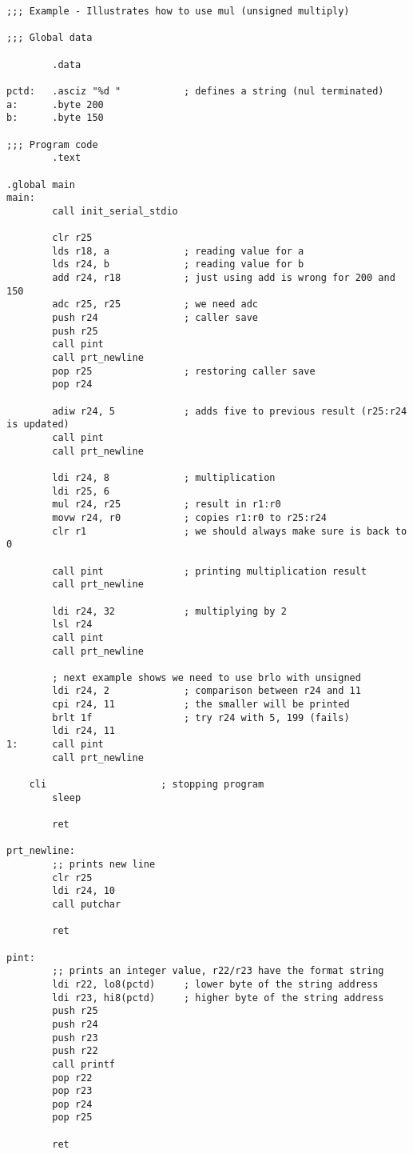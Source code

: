 \lstset{
caption=Unsigned Multiplication
}
\begin{lstlisting}
;;; Example - Illustrates how to use mul (unsigned multiply)
 
;;; Global data

        .data                 

pctd:   .asciz "%d "           ; defines a string (nul terminated)
a:      .byte 200
b:      .byte 150

;;; Program code
        .text                 

.global main                  
main:                          
        call init_serial_stdio

        clr r25
        lds r18, a             ; reading value for a
        lds r24, b             ; reading value for b
        add r24, r18           ; just using add is wrong for 200 and 150
        adc r25, r25           ; we need adc
        push r24               ; caller save
        push r25
        call pint
        call prt_newline
        pop r25                ; restoring caller save
        pop r24 

        adiw r24, 5            ; adds five to previous result (r25:r24 is updated) 
        call pint
        call prt_newline
         
        ldi r24, 8             ; multiplication
        ldi r25, 6 
        mul r24, r25           ; result in r1:r0
        movw r24, r0           ; copies r1:r0 to r25:r24
        clr r1                 ; we should always make sure is back to 0 

        call pint              ; printing multiplication result
        call prt_newline

        ldi r24, 32            ; multiplying by 2
        lsl r24 
        call pint
        call prt_newline

        ; next example shows we need to use brlo with unsigned
        ldi r24, 2             ; comparison between r24 and 11
        cpi r24, 11            ; the smaller will be printed
        brlt 1f                ; try r24 with 5, 199 (fails)
        ldi r24, 11            
1:      call pint
        call prt_newline

    cli                    ; stopping program
        sleep                          

        ret                    

prt_newline:                   
        ;; prints new line
        clr r25
        ldi r24, 10
        call putchar

        ret

pint:
        ;; prints an integer value, r22/r23 have the format string
        ldi r22, lo8(pctd)     ; lower byte of the string address
        ldi r23, hi8(pctd)     ; higher byte of the string address
        push r25
        push r24
        push r23
        push r22
        call printf
        pop r22
        pop r23
        pop r24
        pop r25

        ret
\end{lstlisting}


